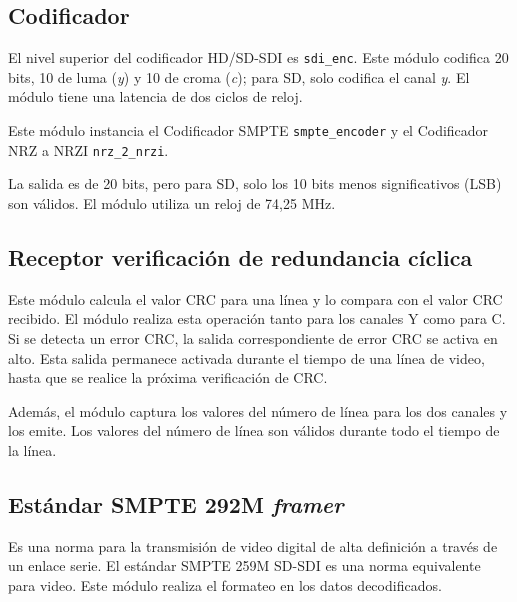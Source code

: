 \subsection{Codificador}

  El nivel superior del codificador HD/SD-SDI es \texttt{sdi\_enc}. Este módulo
  codifica 20 bits, 10 de luma (\textit{y}) y 10 de croma (\textit{c}); para SD,
  solo codifica el canal \textit{y}. El módulo tiene una latencia de dos ciclos
  de reloj.

  Este módulo instancia el Codificador SMPTE \texttt{smpte\_encoder} y el
  Codificador NRZ a NRZI \texttt{nrz\_2\_nrzi}.

  La salida es de 20 bits, pero para SD, solo los 10 bits menos significativos
  (LSB) son válidos. El módulo utiliza un reloj de 74,25 MHz.

\subsection{Receptor verificación de redundancia cíclica}

  Este módulo calcula el valor CRC para una línea y lo compara con el valor CRC
  recibido. El módulo realiza esta operación tanto para los canales Y como para C.
  Si se detecta un error CRC, la salida correspondiente de error CRC se activa en
  alto. Esta salida permanece activada durante el tiempo de una línea de video,
  hasta que se realice la próxima verificación de CRC\@.

  Además, el módulo captura los valores del número de línea para los dos canales
  y los emite. Los valores del número de línea son válidos durante todo el tiempo
  de la línea.

\subsection{Estándar SMPTE 292M \textit{framer}}

Es una norma para la transmisión de video digital de alta definición a través
de un enlace serie. El estándar SMPTE 259M SD-SDI es una norma equivalente
para video. Este módulo realiza el formateo en los datos decodificados.

